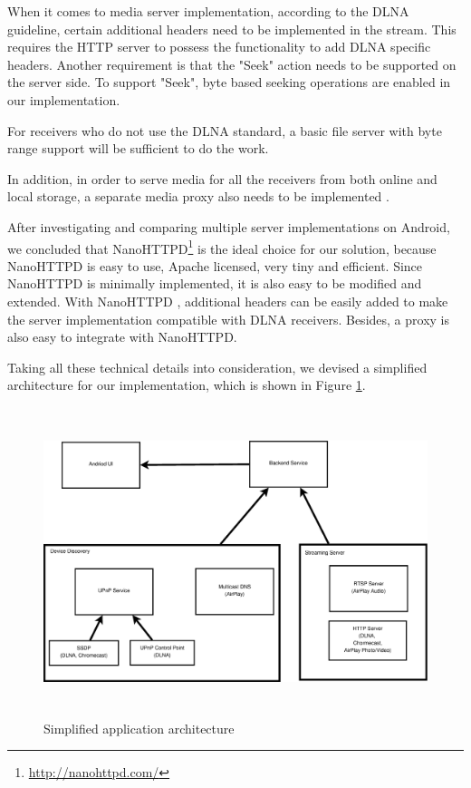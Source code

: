When it comes to media server implementation, according to the DLNA guideline,
certain additional headers need to be implemented in the stream. This
requires the HTTP server to possess the functionality to add DLNA specific
headers. Another requirement is that the "Seek" action needs to be supported on the server side. To support "Seek", byte based seeking operations are enabled in our implementation.

For receivers who do not use the DLNA standard, a basic file server with byte
range support will be sufficient to do the work.

In addition, in order to serve media for all the receivers from both online and
local storage, a separate media proxy also needs to be implemented
\cite{ipv6} \cite{DLNA_proxy2}.

After investigating and comparing multiple server implementations on Android, we
concluded that NanoHTTPD\footnote{\url{http://nanohttpd.com/}} is the ideal
choice for our solution, because NanoHTTPD is easy to use, Apache licensed,
very tiny and efficient. Since NanoHTTPD is minimally implemented, it is also
easy to be modified and extended. With NanoHTTPD , additional headers can be
easily added to make the server implementation compatible with DLNA receivers.
Besides, a proxy is also easy to integrate with  NanoHTTPD.

Taking all these technical details into consideration, we devised a simplified
architecture for our implementation, which is shown in Figure \ref{chart3}.

\begin{figure}[htb]
\centering \includegraphics[height=9cm]{charts/chart3}
\caption{Simplified application architecture\label{chart3}}
\end{figure}

